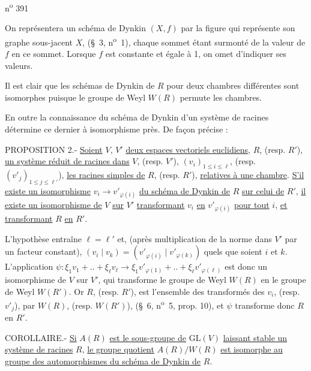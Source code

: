 \hfill n\textsuperscript{o} 391

On représentera un schéma de Dynkin $(X,f)$ par la figure qui représente son graphe sous-jacent $X$, (\S~3, n\textsuperscript{o}~1), chaque sommet étant surmonté de la valeur de $f$ en ce sommet. Lorsque $f$ est constante et égale à 1, on omet d'indiquer ses valeurs.

Il est clair que les schémas de Dynkin de $R$ pour deux chambres différentes sont isomorphes puisque le groupe de Weyl $W(R)$ permute les chambres.

En outre la connaissance du schéma de Dynkin d'un système de racines détermine ce dernier à isomorphisme près. De façon précise :

PROPOSITION 2.- \uline{Soient} $V$, $V'$ \uline{deux espaces vectoriels euclidiens}, $R$, (resp. $R'$), \uline{un système réduit de racines dans} $V$, (resp. $V'$), $(v_i)_{1\leq i\leq\ell}$, (resp. $(v'_j)_{1\leq j\leq\ell'}$), \uline{les racines simples de} $R$, (resp. $R'$), \uline{relatives à une chambre}. \uline{S'il existe un isomorphisme} $v_i\longrightarrow v'_{\varphi(i)}$ \uline{du schéma de Dynkin de} $R$ \uline{sur celui de} $R'$, \uline{il existe un isomorphisme de} $V$ \uline{sur} $V'$ \uline{transformant} $v_i$ \uline{en} $v'_{\varphi(i)}$ \uline{pour tout} $i$, \uline{et transformant} $R$ \uline{en} $R'$.

L'hypothèse entraîne $\ell=\ell'$ et, (après multiplication de la norme dans $V'$ par un facteur constant), $(v_i\mid v_k)=(v'_{\varphi(i)}\mid v'_{\varphi(k)})$ quels que soient $i$ et $k$. L'application $\psi:\xi_1v_1+..+\xi_\ell v_\ell\longrightarrow\xi_1v'_{\varphi(1)}+..+\xi_\ell v'_{\varphi(\ell)}$ est donc un isomorphisme de $V$ sur $V'$, qui transforme le groupe de Weyl $W(R)$ en le groupe de Weyl $W(R')$. Or $R$, (resp. $R'$), est l'ensemble des transformés des $v_i$, (resp. $v'_j$), par $W(R)$, (resp. $W(R')$), (\S~6, n\textsuperscript{o}~5, prop. 10), et $\psi$ transforme donc $R$ en $R'$.

COROLLAIRE.- \uline{Si} $A(R)$ \uline{est le sous-groupe de} $\mathrm{GL}(V)$ \uline{laissant stable un système de racines} $R$, \uline{le groupe quotient} $A(R)/W(R)$ \uline{est isomorphe au groupe des automorphismes du schéma de Dynkin de} $R$.

